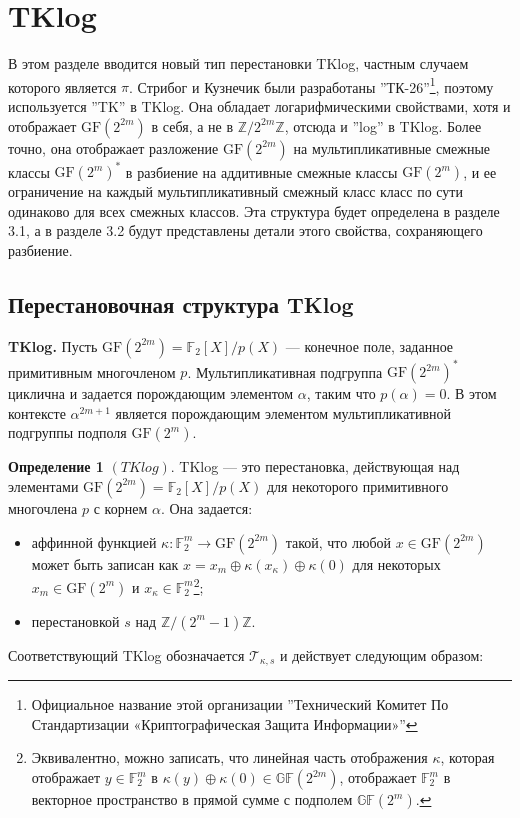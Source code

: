 \section{TKlog}

В этом разделе вводится новый тип перестановки TKlog, частным случаем которого является \(\pi\). Стрибог и Кузнечик были разработаны ''ТК-26''\footnote{Официальное название этой организации ''Технический Комитет По Стандартизации «Криптографическая Защита Информации»''}, поэтому используется ''TK'' в TKlog. Она обладает логарифмическими свойствами, хотя и отображает \(\mathrm{GF}(2^{2m})\) в себя, а не в \(\mathbb{Z}/2^{2m}\mathbb{Z}\), отсюда и ''log'' в TKlog. Более точно, она отображает разложение \(\mathrm{GF}(2^{2m})\) на мультипликативные смежные классы \(\mathrm{GF}(2^m)^*\) в разбиение на аддитивные смежные классы \(\mathrm{GF}(2^m)\), и ее ограничение на каждый мультипликативный смежный класс класс по сути одинаково для всех смежных классов. Эта структура будет определена в разделе 3.1, а в разделе 3.2 будут представлены детали этого свойства, сохраняющего разбиение.

\subsection{Перестановочная структура TKlog}

\textbf{TKlog.} Пусть \(\mathrm{GF}(2^{2m}) = \mathbb{F}_2[X]/p(X)\) — конечное поле, заданное примитивным многочленом \(p\). Мультипликативная подгруппа \(\mathrm{GF}(2^{2m})^*\) циклична и задается порождающим элементом \(\alpha\), таким что \(p(\alpha) = 0\). В этом контексте \(\alpha^{2m+1}\) является порождающим элементом мультипликативной подгруппы подполя \(\mathrm{GF}(2^m)\).

\textbf{Определение 1} \((TKlog)\). TKlog — это перестановка, действующая над элементами \(\mathrm{GF}(2^{2m}) = \mathbb{F}_2[X]/p(X)\) для некоторого примитивного многочлена \(p\) с корнем \(\alpha\). Она задается:
\begin{itemize}
    \item аффинной функцией \(\kappa : \mathbb{F}^m_2 \to \mathrm{GF}(2^{2m})\) такой, что любой \(x \in \mathrm{GF}(2^{2m})\) может быть записан как \(x = x_m \oplus \kappa(x_\kappa) \oplus \kappa(0)\) для некоторых \(x_m \in \mathrm{GF}(2^m)\) и \(x_\kappa \in \mathbb{F}^m_2\)\footnote{Эквивалентно, можно записать, что линейная часть отображения \(\kappa\), которая отображает \(y \in \mathbb{F}_2^m\) в \(\kappa(y) \oplus \kappa(0) \in \mathbb{GF}(2^{2m})\), отображает \(\mathbb{F}_2^m\) в векторное пространство в прямой сумме с подполем \(\mathbb{GF}(2^m)\).};
    \item перестановкой \(s\) над \(\mathbb{Z}/(2^m - 1)\mathbb{Z}\).
\end{itemize}
Соответствующий TKlog обозначается \(\mathscr{T}_{\kappa,s}\) и действует следующим образом:


